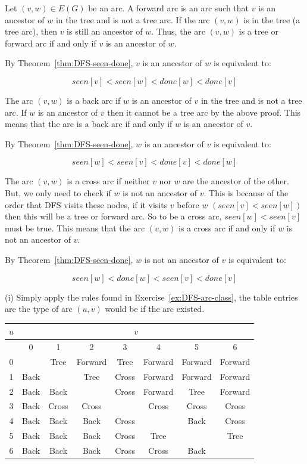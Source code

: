 Let \((v,w) \in E(G)\) be an arc. A forward arc is an arc such that
\(v\) is an ancestor of \(w\) in the tree and is not a tree arc.
If the arc \((v,w)\) is in the tree (a tree arc), then \(v\) is
still an ancestor of \(w\). Thus, the arc \((v,w)\) is a tree or
forward arc if and only if \(v\) is an ancestor of \(w\).

By Theorem~\ref{thm:DFS-seen-done}, \(v\) is an ancestor of \(w\) is equivalent to:  

\[seen[v] < seen[w] < done[w] < done[v]\]

The arc \((v,w)\) is a back arc if \(w\) is an ancestor of \(v\)
in the tree and is not a tree arc. If \(w\) is an ancestor of \(v\)
then it cannot be a tree arc by the above proof. This means that
the arc is a back arc if and only if \(w\) is an ancestor of \(v\).

By Theorem~\ref{thm:DFS-seen-done}, \(w\) is an ancestor of \(v\) is equivalent to:

\[seen[w] < seen[v] < done[v] < done[w]\]

The arc \((v,w)\) is a cross arc if neither \(v\) nor \(w\) are the ancestor of the other. 
But, we only need to check if \(w\) is not an ancestor of \(v\). This is because of the order 
that DFS visits these nodes, if it visits \(v\) before \(w\) \((seen[v] < seen[w])\) then 
this will be a tree or forward arc. So to be a cross arc, \(seen[w] < seen[v]\) must be true. 
This means that the arc \((v,w)\) is a cross arc if and only if \(w\) is not an ancestor of \(v\).

By Theorem~\ref{thm:DFS-seen-done}, \(w\) is not an ancestor of \(v\) is equivalent to: 

\[seen[w] < done[w] < seen[v] < done[v]\]


(i) Simply apply the rules found in Exercise~\ref{ex:DFS-arc-class},            
the table entries are the type of arc \((u,v)\) would be if the arc existed.

\begin{center}
\begin{tabular}{|c|c|c|c|c|c|c|c|}
\hline
\(u\)& \multicolumn{7}{|c|}{\(v\)} \\
\hline
& 0& 1& 2& 3& 4& 5& 6 \\
\hline
0& & Tree& Forward& Tree& Forward& Forward& Forward \\
\hline
1& Back& & Tree& Cross& Forward& Forward& Forward \\
\hline
2& Back& Back& & Cross& Forward& Tree& Forward \\
\hline
3& Back& Cross& Cross& & Cross& Cross& Cross \\
\hline
4& Back& Back& Back& Cross& & Back& Cross \\
\hline
5& Back& Back& Back& Cross& Tree& & Tree \\
\hline
6& Back& Back& Back& Cross& Cross& Back&  \\
\hline
\end{tabular}
\end{center}

